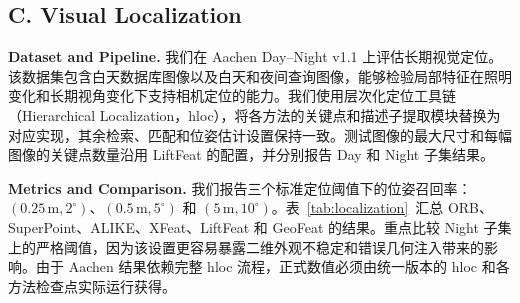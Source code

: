 \documentclass{article}
\begin{document}
\begin{table}[!t]
\centering
\caption{HPatches 上的单应性估计结果。报告 Illumination 和 Viewpoint 子集上的 MHA@3、MHA@5 和 MHA@7；对比方法数值引自 LiftFeat~\cite{LiftFeat}。}
\label{tab:homography}
\small
{}
\end{table}

\subsection{C. Visual Localization}
\noindent\textbf{Dataset and Pipeline.} 我们在 Aachen Day--Night v1.1 上评估长期视觉定位。该数据集包含白天数据库图像以及白天和夜间查询图像，能够检验局部特征在照明变化和长期视角变化下支持相机定位的能力。我们使用层次化定位工具链（Hierarchical Localization，hloc），将各方法的关键点和描述子提取模块替换为对应实现，其余检索、匹配和位姿估计设置保持一致。测试图像的最大尺寸和每幅图像的关键点数量沿用 LiftFeat 的配置，并分别报告 Day 和 Night 子集结果。

\noindent\textbf{Metrics and Comparison.} 我们报告三个标准定位阈值下的位姿召回率：$(0.25\,\mathrm{m},2^\circ)$、$(0.5\,\mathrm{m},5^\circ)$ 和 $(5\,\mathrm{m},10^\circ)$。表~\ref{tab:localization}~汇总 ORB、SuperPoint、ALIKE、XFeat、LiftFeat 和 GeoFeat 的结果。重点比较 Night 子集上的严格阈值，因为该设置更容易暴露二维外观不稳定和错误几何注入带来的影响。由于 Aachen 结果依赖完整 hloc 流程，正式数值必须由统一版本的 hloc 和各方法检查点实际运行获得。
\end{document}
